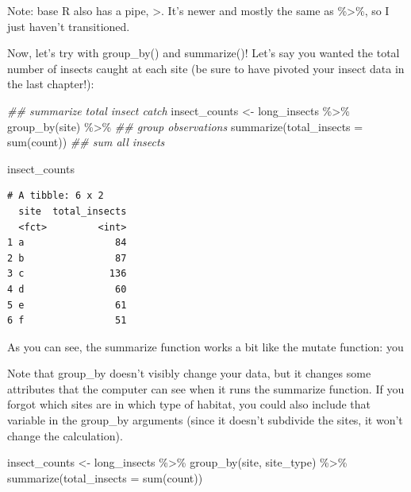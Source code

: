 \documentclass[
  letterpaper,
  DIV=11,
  numbers=noendperiod]{scrreprt}
\newenvironment{Shaded}{\begin{snugshade}}{\end{snugshade}}
\newcommand{\AttributeTok}[1]{\textcolor[rgb]{0.40,0.45,0.13}{#1}}
\newcommand{\DocumentationTok}[1]{\textcolor[rgb]{0.37,0.37,0.37}{\textit{#1}}}
\newcommand{\FunctionTok}[1]{\textcolor[rgb]{0.28,0.35,0.67}{#1}}
\newcommand{\NormalTok}[1]{\textcolor[rgb]{0.00,0.23,0.31}{#1}}
\newcommand{\OtherTok}[1]{\textcolor[rgb]{0.00,0.23,0.31}{#1}}
\newcommand{\SpecialCharTok}[1]{\textcolor[rgb]{0.37,0.37,0.37}{#1}}
\begin{document}
Note: base R also has a pipe, \textbar\textgreater. It's newer and
mostly the same as \%\textgreater\%, so I just haven't transitioned.

Now, let's try with group\_by() and summarize()! Let's say you wanted
the total number of insects caught at each site (be sure to have pivoted
your insect data in the last chapter!):

\begin{Shaded}
\begin{Highlighting}[]
\DocumentationTok{\#\# summarize total insect catch}
\NormalTok{insect\_counts }\OtherTok{\textless{}{-}}\NormalTok{ long\_insects }\SpecialCharTok{\%\textgreater{}\%}
  \FunctionTok{group\_by}\NormalTok{(site) }\SpecialCharTok{\%\textgreater{}\%} \DocumentationTok{\#\# group observations}
  \FunctionTok{summarize}\NormalTok{(}\AttributeTok{total\_insects =} \FunctionTok{sum}\NormalTok{(count)) }\DocumentationTok{\#\# sum all insects}

\NormalTok{insect\_counts}
\end{Highlighting}
\end{Shaded}

\begin{verbatim}
# A tibble: 6 x 2
  site  total_insects
  <fct>         <int>
1 a                84
2 b                87
3 c               136
4 d                60
5 e                61
6 f                51
\end{verbatim}

As you can see, the summarize function works a bit like the mutate
function: you

Note that group\_by doesn't visibly change your data, but it changes
some attributes that the computer can see when it runs the summarize
function. If you forgot which sites are in which type of habitat, you
could also include that variable in the group\_by arguments (since it
doesn't subdivide the sites, it won't change the calculation).

\begin{Shaded}
\begin{Highlighting}[]
\NormalTok{insect\_counts }\OtherTok{\textless{}{-}}\NormalTok{ long\_insects }\SpecialCharTok{\%\textgreater{}\%}
  \FunctionTok{group\_by}\NormalTok{(site, site\_type) }\SpecialCharTok{\%\textgreater{}\%}
  \FunctionTok{summarize}\NormalTok{(}\AttributeTok{total\_insects =} \FunctionTok{sum}\NormalTok{(count))}
\end{Highlighting}
\end{Shaded}
\end{document}
